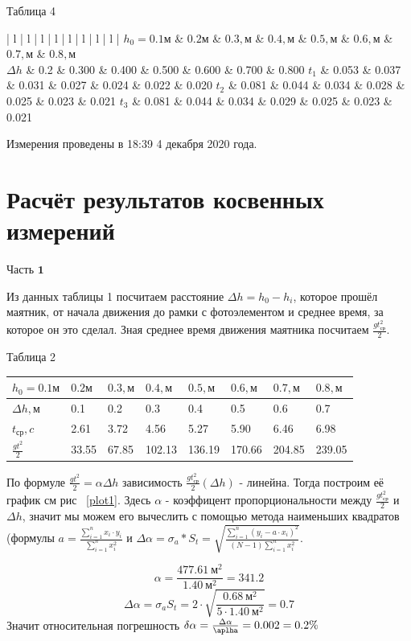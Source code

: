 \documentclass[a4paper]{article}
\begin{document}
Таблица 4

\begin{tabular}{| l | l | l | l | l | l | l | l |}\hline
$h_0 = 0.1 м$ & $0.2 м$ & $0.3, м$ & $0.4, м$ & $0.5, м$ & $0.6, м$ & $0.7, м$ & $0.8, м$ \\ \hline
$\Delta h$ & 0.2 & 0.300 & 0.400 & 0.500 & 0.600 & 0.700 & 0.800
$t_1$ & 0.053 & 0.037 & 0.031 & 0.027 & 0.024 & 0.022 & 0.020
$t_2$ & 0.081 & 0.044 & 0.034 & 0.028 & 0.025 & 0.023 & 0.021
$t_3$ & 0.081 & 0.044 & 0.034 & 0.029 & 0.025 & 0.023 & 0.021
\end{tabular}

Измерения проведены в 18:39 4 декабря 2020 года.

\section{Расчёт результатов косвенных измерений}
$\textbf{Часть 1}$

Из данных таблицы 1 посчитаем расстояние $\Delta h = h_0 - h_i$, которое прошёл маятник, от начала движения до рамки с фотоэлементом и среднее время, за которое он это сделал. Зная среднее время движения маятника посчитаем $\frac{gt^2_{ср}}{2}$.

Таблица 2

\begin{tabular}{| l | l | l | l | l | l | l | l |}\hline
$h_0 = 0.1 м$ & $0.2 м$ & $0.3, м$ & $0.4, м$ & $0.5, м$ & $0.6, м$ & $0.7, м$ & $0.8, м$ \\ \hline
$\Delta h, м$ & 0.1 & 0.2 & 0.3 & 0.4 & 0.5 & 0.6 & 0.7 \\ \hline
$t_{ср}, c$ & 2.61 & 3.72 & 4.56 & 5.27 & 5.90 & 6.46 & 6.98 \\ \hline
$\frac{gt^2}{2}$ & 33.55 & 67.85 & 102.13 & 136.19 & 170.66 & 204.85 & 239.05 \\ \hline
\end{tabular}

По формуле $ \frac{gt^2}{2} = \alpha \Delta h$ зависимость $\frac{gt^2_{ср}}{2} (\Delta h)$ - линейна. Тогда построим её график см рис ~\ref{plot1}. Здесь $\alpha$ - коэффицент пропорциональности между $\frac{gt^2_{ср}}{2}$ и $\Delta h$, значит мы можем его вычеслить с помощью метода наименьших квадратов (формулы $ a = \frac{\sum_{i=1}^n x_i\cdot y_i}{\sum_{i=1}^n x^2_i}$ и $\Delta \alpha = \sigma_a * S_t = \sqrt{\frac{\sum_{i=1}^n (y_i - a\cdot x_i)^2}{(N-1)\sum_{i=1}^n x^2_i}}$. 

\[\alpha =  \frac{477.61 \ м^2}{1.40 \ м^2} = 341.2\]
\[\Delta \alpha = \sigma_a S_t = 2 \cdot \sqrt{\frac{0.68 \ м^2}{5 \cdot 1.40 \ м^2 }} = 0.7\]
Значит относительная погрешность $\delta \alpha= \frac{\Delta \alpha}{\aplha} = 0.002 = 0.2\%$
\end{document}
